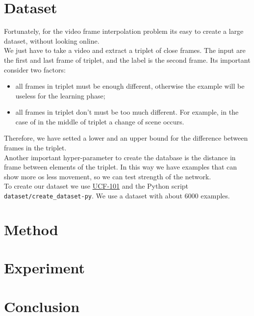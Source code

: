 \documentclass[11pt, a4paper]{article}
\begin{document}
	\section{Dataset}
	Fortunately, for the video frame interpolation problem its easy to create a large dataset, without looking online.\\
	We just have to take a video and extract a triplet of close frames. The input are the first and last frame of triplet, and the label is the second frame. Its important consider two factors:
	\begin{itemize}
		\item all frames in triplet must be enough different, otherwise the example will be useless for the learning phase;
		\item all frames in triplet don't must be too much different. For example, in the case of in the middle of triplet a change of scene occurs. 
	\end{itemize}
	Therefore, we have setted a lower and an upper bound for the difference between frames in the triplet.\\
	Another important hyper-parameter to create the database is the distance in frame between elements of the triplet. In this way we have examples that can show more os less movement, so we can test strength of the network.\\
	To create our dataset we use \href{https://www.crcv.ucf.edu/data/UCF101.php}{UCF-101} and the Python script\\ \texttt{dataset/create\_dataset-py}. We use a dataset with about 6000 examples.
	\section{Method} %
	\section{Experiment} %
	\section{Conclusion}
	
	
	
	
\end{document}
